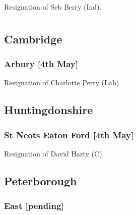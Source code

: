 \documentclass[a4paper,openany]{book}
\begin{document}
\begin{resultsiii}

Resignation of Seb Berry (Ind).

\section[Cambridgeshire]{}

\subsection*{Cambridge}

\subsubsection*{Arbury \hspace*{\fill}\nolinebreak[1]%
\enspace\hspace*{\fill}
[4th May]}


Resignation of Charlotte Perry (Lab).

\subsection*{Huntingdonshire}

\subsubsection*{St Neots Eaton Ford \hspace*{\fill}\nolinebreak[1]%
\enspace\hspace*{\fill}
[4th May]}


Resignation of David Harty (C).

\subsection*{Peterborough}

\subsubsection*{East \hspace*{\fill}\nolinebreak[1]%
\enspace\hspace*{\fill}
[pending]}


\end{resultsiii}
\end{document}
